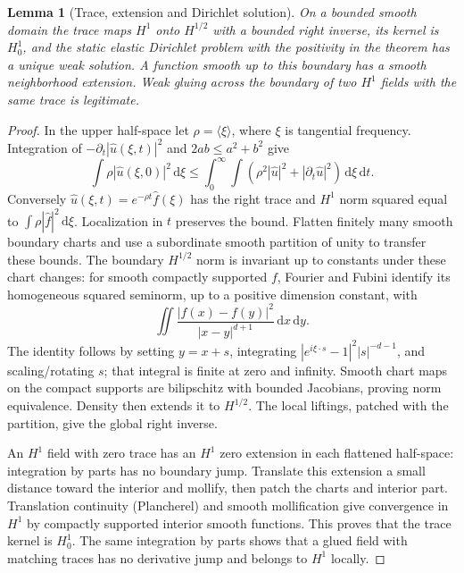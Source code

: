 \documentclass[11pt]{article}
\newcommand{\dd}{\mathrm d}
\newtheorem{lemma}[theorem]{Lemma}
\theoremstyle{remark}
\numberwithin{equation}{section}
\begin{document}
\begin{lemma}[Trace, extension and Dirichlet solution]\label{lem:boundary-background}
On a bounded smooth domain the trace maps $H^1$ onto $H^{1/2}$ with a
bounded right inverse, its kernel is $H^1_0$, and the static elastic
Dirichlet problem with the positivity in the theorem has a unique weak
solution. A function smooth up to this boundary has a smooth neighborhood
extension. Weak gluing across the boundary of two $H^1$ fields with the
same trace is legitimate.
\end{lemma}
\begin{proof}
In the upper half-space let $\rho=\langle\xi\rangle$, where $\xi$ is
tangential frequency. Integration of $-\partial_t|\widehat u(\xi,t)|^2$
and $2ab\le a^2+b^2$ give
\[
 \int \rho|\widehat u(\xi,0)|^2\,\dd\xi
 \le\int_0^\infty\int
 (\rho^2|\widehat u|^2+|\partial_t\widehat u|^2)\,\dd\xi\,\dd t.
\]
Conversely $\widehat u(\xi,t)=e^{-\rho t}\widehat f(\xi)$ has the
right trace and $H^1$ norm squared equal to
$\int\rho|\widehat f|^2\,\dd\xi$. Localization in $t$ preserves the
bound. Flatten finitely many smooth boundary charts and use a subordinate
smooth partition of unity to transfer these bounds. The boundary
$H^{1/2}$ norm is invariant up to constants under these chart changes:
for smooth compactly supported $f$, Fourier and Fubini identify its
homogeneous squared seminorm, up to a positive dimension constant, with
\[
 \iint\frac{|f(x)-f(y)|^2}{|x-y|^{d+1}}\,\dd x\,\dd y.
\]
The identity follows by setting $y=x+s$, integrating
$|e^{i\xi\cdot s}-1|^2|s|^{-d-1}$, and scaling/rotating $s$; that
integral is finite at zero and infinity. Smooth chart maps on the compact
supports are bilipschitz with bounded Jacobians, proving norm equivalence.
Density then extends it to $H^{1/2}$. The local liftings, patched with the
partition, give the global right inverse.

An $H^1$ field with zero trace has an $H^1$ zero extension in each flattened
half-space: integration by parts has no boundary jump. Translate this
extension a small distance toward the interior and mollify, then patch
the charts and interior part. Translation continuity (Plancherel) and
smooth mollification give convergence in $H^1$ by compactly supported
interior smooth functions. This proves that the trace kernel is $H^1_0$.
The same integration by parts shows that a glued field with matching
traces has no derivative jump and belongs to $H^1$ locally.


\end{proof}
\end{document}
